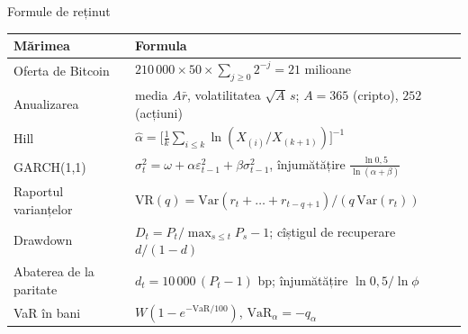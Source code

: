 \begin{frame}{Formule de reținut}
\itemsize{\small}
{\renewcommand{\arraystretch}{1.4}\begin{center}
\scriptsize
\begin{tabular}{ll}
\toprule
\textbf{Mărimea} & \textbf{Formula} \\
\midrule
Oferta de Bitcoin & $210\,000 \times 50 \times \sum_{j \ge 0} 2^{-j} = 21$ milioane \\
Anualizarea & media $A\bar r$, volatilitatea $\sqrt{A}\,s$; $A = 365$ (cripto), $252$ (acțiuni) \\
Hill & $\hat\alpha = \big[\frac1k\sum_{i \le k}\ln(X_{(i)}/X_{(k+1)})\big]^{-1}$ \\
GARCH(1,1) & $\sigma_t^2 = \omega + \alpha\varepsilon_{t-1}^2 + \beta\sigma_{t-1}^2$, înjumătățire $\frac{\ln 0{,}5}{\ln(\alpha + \beta)}$ \\
Raportul varianțelor & $\mathrm{VR}(q) = \mathrm{Var}(r_t + \dots + r_{t-q+1})/(q\,\mathrm{Var}(r_t))$ \\
Drawdown & $D_t = P_t/\max_{s \le t}P_s - 1$; cîștigul de recuperare $d/(1 - d)$ \\
Abaterea de la paritate & $d_t = 10\,000\,(P_t - 1)$ bp; înjumătățire $\ln 0{,}5/\ln\phi$ \\
VaR în bani & $W(1 - e^{-\mathrm{VaR}/100})$, $\mathrm{VaR}_\alpha = -q_\alpha$ \\
\bottomrule
\end{tabular}
\end{center}
}
\end{frame}

